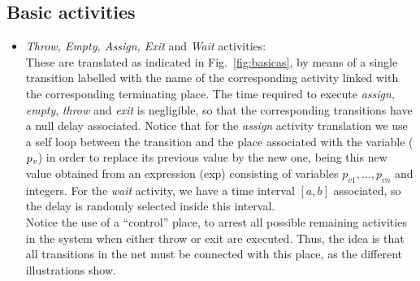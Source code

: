 

\subsection*{Basic activities}
\begin{itemize}
\item {\it Throw, Empty, Assign, Exit} and  {\it Wait} activities:\\
%
These are translated as indicated in \mbox{Fig.\ \ref{fig:basicas}},
by means of a single transition labelled
with the name of the corresponding activity linked with the corresponding terminating place. 
The time required  to execute 
{\it assign}, {\it empty}, {\it throw} and {\it exit} is negligible, so that the 
corresponding transitions have a null delay associated.
Notice that for the {\em assign} activity translation we use
a self loop between the transition and the
place associated with the variable ($p_{\it v}$)
in order to replace its previous value by the new one, being this new value obtained from an expression (exp) consisting of variables $p_{v1},\ldots,p_{vn}$ and integers. For the {\it wait}
activity, we have a time interval $[a,b]$ associated, so the delay is randomly selected
inside this interval.\\
Notice the use of a ``control'' place, to arrest all possible remaining activities in the system when either throw or exit are executed. Thus, the idea is that all transitions in the net must be connected with this place, as the different illustrations show.



\end{itemize}
